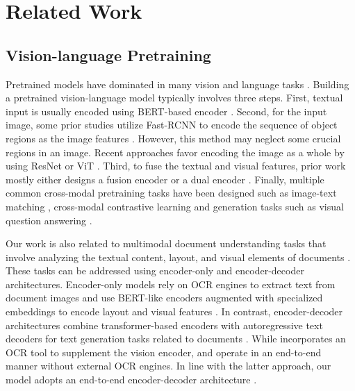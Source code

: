 \documentclass[11pt]{article}
\begin{document}
\vspace{-1mm}
\section{Related Work}
\vspace{-2mm}
\subsection{Vision-language Pretraining}
Pretrained models have dominated 
in many vision and language 
tasks \cite{ijcai2022p762}. 
Building a pretrained vision-language model typically involves three steps. 
First, textual input is usually encoded using BERT-based encoder 
\cite{lu2019vilbert,
radford2021learning, ALBEF, li2022blip}. Second, for the input image, some prior studies utilize Fast-RCNN \cite{faster-rcnn} to encode the sequence of object regions as the image features \cite{li2019visualbert, lu2019vilbert, 
chen2020uniter}.  However, this method may neglect some crucial regions in an image. Recent approaches favor encoding the image as a whole \cite{pixel-bert, huang2021seeing, ALBEF, li2022blip} by using ResNet \cite{resnet} or ViT \cite{vit}. Third, to fuse the textual and visual features, prior work mostly either designs a fusion encoder \cite{lxmert,Su2020VL-BERT,vlt5,vilt} or a dual encoder \cite{radford2021learning,jia2021scaling,li2022blip}. Finally, multiple common cross-modal pretraining tasks have been designed such as  image-text matching \cite{chen2020uniter, li2020unicoder}, cross-modal contrastive learning \cite{radford2021learning,jia2021scaling} and generation tasks such as visual question answering \cite{vlt5, wang2021simvlm}. 

Our work is also related to multimodal document understanding tasks that involve analyzing the textual content, layout, and visual elements of documents \cite{Xu2020, xu2020layoutlmv2, wang2022lilt, layoutlmv3, kim2022ocr, tang2022unifying}. 
These tasks can be addressed using encoder-only and encoder-decoder architectures. Encoder-only models rely on OCR engines to extract text from document images and use BERT-like encoders augmented with specialized embeddings to encode layout and visual features \cite{Xu2020, xu2020layoutlmv2, wang2022lilt, layoutlmv3}.
In contrast, encoder-decoder architectures combine transformer-based 
encoders with autoregressive text decoders for text generation tasks related to documents \cite{tang2022unifying, kim2022ocr, lee2022pix2struct}.
While \citet{tang2022unifying} incorporates an OCR tool to supplement the vision encoder, \citet{kim2022ocr} and \citet{lee2022pix2struct} operate in an end-to-end manner without external OCR engines. In line with the latter approach, our model adopts an end-to-end encoder-decoder architecture \cite{kim2022ocr}.
\end{document}
